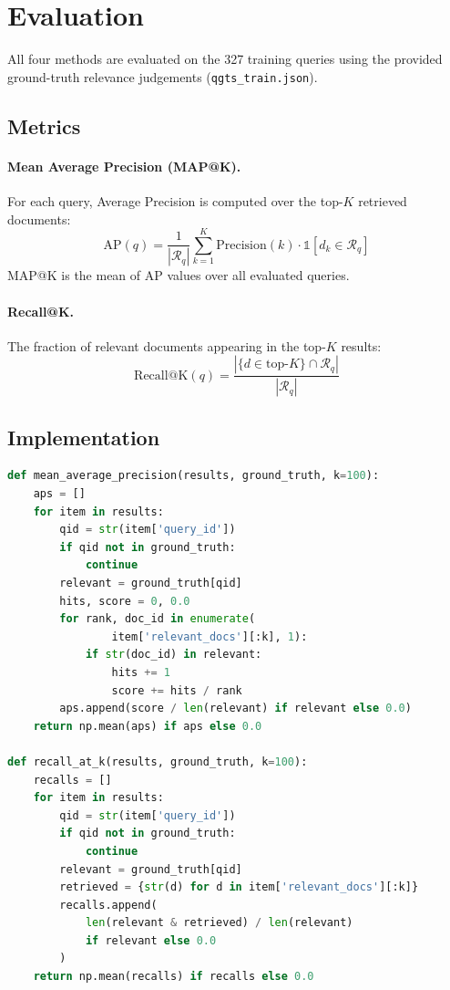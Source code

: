 \documentclass[11pt,a4paper]{article}
\begin{document}
\section{Evaluation}

All four methods are evaluated on the 327 training queries using the provided
ground-truth relevance judgements (\texttt{qgts\_train.json}).

\subsection{Metrics}

\paragraph{Mean Average Precision (MAP@K).}
For each query, Average Precision is computed over the top-$K$ retrieved
documents:
\[
\text{AP}(q) = \frac{1}{|\mathcal{R}_q|}
  \sum_{k=1}^{K} \text{Precision}(k) \cdot \mathbb{1}[d_k \in \mathcal{R}_q]
\]
MAP@K is the mean of AP values over all evaluated queries.

\paragraph{Recall@K.}
The fraction of relevant documents appearing in the top-$K$ results:
\[
\text{Recall@K}(q) = \frac{|\{d \in \text{top-}K\} \cap \mathcal{R}_q|}{|\mathcal{R}_q|}
\]

\subsection{Implementation}

\begin{lstlisting}[language=Python]
def mean_average_precision(results, ground_truth, k=100):
    aps = []
    for item in results:
        qid = str(item['query_id'])
        if qid not in ground_truth:
            continue
        relevant = ground_truth[qid]
        hits, score = 0, 0.0
        for rank, doc_id in enumerate(
                item['relevant_docs'][:k], 1):
            if str(doc_id) in relevant:
                hits += 1
                score += hits / rank
        aps.append(score / len(relevant) if relevant else 0.0)
    return np.mean(aps) if aps else 0.0

def recall_at_k(results, ground_truth, k=100):
    recalls = []
    for item in results:
        qid = str(item['query_id'])
        if qid not in ground_truth:
            continue
        relevant = ground_truth[qid]
        retrieved = {str(d) for d in item['relevant_docs'][:k]}
        recalls.append(
            len(relevant & retrieved) / len(relevant)
            if relevant else 0.0
        )
    return np.mean(recalls) if recalls else 0.0
\end{lstlisting}
\end{document}
